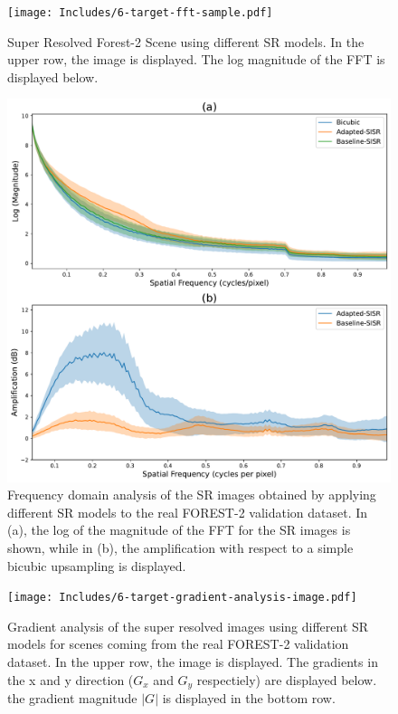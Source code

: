         \begin{figure}[H]
            \centering
            \texttt{[image: Includes/6-target-fft-sample.pdf]}
            \caption{Super Resolved Forest-2 Scene using different SR models. 
                     In the upper row, the image is displayed. The log magnitude of the FFT is displayed below.}
            \label{fig:6-target-fft-sample}
        \end{figure}


        \begin{figure}[H]
            \centering
            \includegraphics[scale=0.5]{Includes/5-target-amplification-statistics.pdf}
            \caption{Frequency domain analysis of the SR images obtained by applying different SR models to the real FOREST-2 validation dataset.
            In (a), the log of the magnitude of the FFT for the SR images is shown,
            while in (b), the amplification with respect to a  simple bicubic upsampling is displayed.}
            \label{fig:5-target-amplification-statistics}
        \end{figure}

        \begin{figure}[H]
            \centering
            \texttt{[image: Includes/6-target-gradient-analysis-image.pdf]}
            \caption{Gradient analysis of the super resolved images using different SR models for scenes coming from the real FOREST-2 validation dataset.
                     In the upper row, the image is displayed. The gradients in the x and y direction ($G_x$ and $G_y$ respectiely) are displayed below.
                     the gradient magnitude $|G|$ is displayed in the bottom row.}
            \label{fig:6-target-gradient-analysis-image}
        \end{figure}

